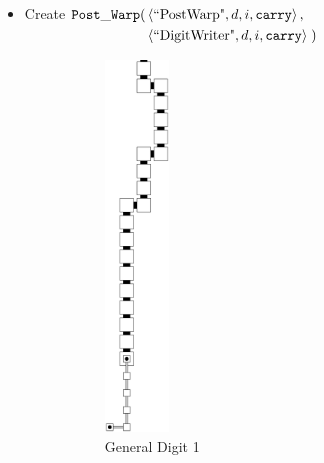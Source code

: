 \begin{itemize}
            \item
            Create
            $\begin{aligned}[t]
                {\tt Post\_Warp}(& \left \langle \text{``PostWarp"},    d, i, {\tt carry} \right\rangle, \\
                          & \left \langle \text{``DigitWriter"}, d, i, {\tt carry} \right\rangle \;)
            \end{aligned}$

            \begin{figure}[H]
                \begin{subfigure}[t]{0.2\textwidth}
                    \centering
                    \includegraphics[width=0.2\textwidth]{warping/post_warp_general_digit1}
                    \caption{\label{fig:warping/post_warp_general_digit1} General Digit 1}
                \end{subfigure}%
                ~
                \begin{subfigure}[t]{0.2\textwidth}
                    \centering

\end{subfigure}
\end{figure}
\end{itemize}
